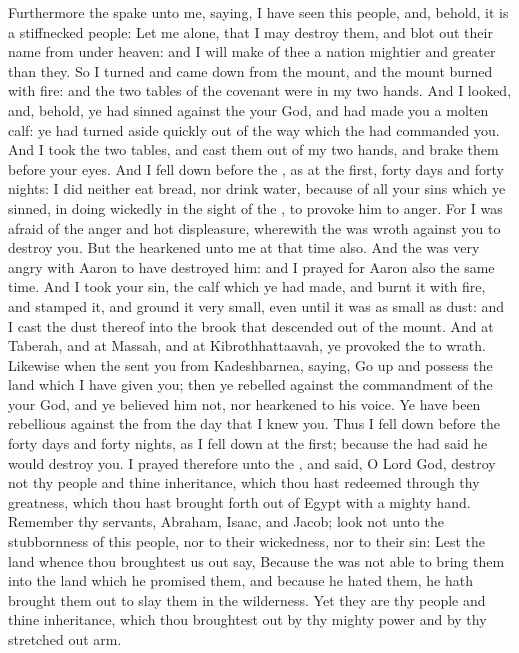 \begin{biblechapter}
\verse Furthermore the \LORD spake unto me, saying, I have seen this people, and, behold, it is a stiffnecked people:
\verse Let me alone, that I may destroy them, and blot out their name from under heaven: and I will make of thee a nation mightier and greater than they.
\verse So I turned and came down from the mount, and the mount burned with fire: and the two tables of the covenant were in my two hands.
\verse And I looked, and, behold, ye had sinned against the \LORD your God, and had made you a molten calf: ye had turned aside quickly out of the way which the \LORD had commanded you.
\verse And I took the two tables, and cast them out of my two hands, and brake them before your eyes.
\verse And I fell down before the \LORD, as at the first, forty days and forty nights: I did neither eat bread, nor drink water, because of all your sins which ye sinned, in doing wickedly in the sight of the \LORD, to provoke him to anger.
\verse For I was afraid of the anger and hot displeasure, wherewith the \LORD was wroth against you to destroy you. But the \LORD hearkened unto me at that time also.
\verse And the \LORD was very angry with Aaron to have destroyed him: and I prayed for Aaron also the same time.
\verse And I took your sin, the calf which ye had made, and burnt it with fire, and stamped it, and ground it very small, even until it was as small as dust: and I cast the dust thereof into the brook that descended out of the mount.
\verse And at Taberah, and at Massah, and at Kibrothhattaavah, ye provoked the \LORD to wrath.
\verse Likewise when the \LORD sent you from Kadeshbarnea, saying, Go up and possess the land which I have given you; then ye rebelled against the commandment of the \LORD your God, and ye believed him not, nor hearkened to his voice.
\verse Ye have been rebellious against the \LORD from the day that I knew you.
\verse Thus I fell down before the \LORD forty days and forty nights, as I fell down at the first; because the \LORD had said he would destroy you.
\verse I prayed therefore unto the \LORD, and said, O Lord God, destroy not thy people and thine inheritance, which thou hast redeemed through thy greatness, which thou hast brought forth out of Egypt with a mighty hand.
\verse Remember thy servants, Abraham, Isaac, and Jacob; look not unto the stubbornness of this people, nor to their wickedness, nor to their sin:
\verse Lest the land whence thou broughtest us out say, Because the \LORD was not able to bring them into the land which he promised them, and because he hated them, he hath brought them out to slay them in the wilderness.
\verse Yet they are thy people and thine inheritance, which thou broughtest out by thy mighty power and by thy stretched out arm.
\end{biblechapter}

